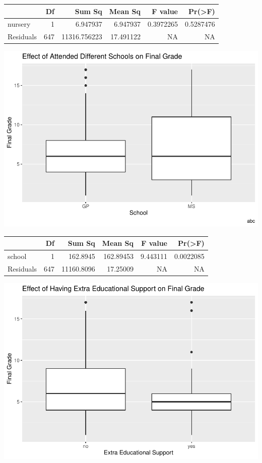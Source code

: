 \documentclass[
]{article}
\begin{document}
\begin{tabular}{l|r|r|r|r|r}
\hline
  & Df & Sum Sq & Mean Sq & F value & Pr(>F)\\
\hline
nursery & 1 & 6.947937 & 6.947937 & 0.3972265 & 0.5287476\\
\hline
Residuals & 647 & 11316.756223 & 17.491122 & NA & NA\\
\hline
\end{tabular}
\newpage

\includegraphics{proj.-1write-up_files/figure-latex/por-school-1.pdf}

\begin{tabular}{l|r|r|r|r|r}
\hline
  & Df & Sum Sq & Mean Sq & F value & Pr(>F)\\
\hline
school & 1 & 162.8945 & 162.89453 & 9.443111 & 0.0022085\\
\hline
Residuals & 647 & 11160.8096 & 17.25009 & NA & NA\\
\hline
\end{tabular}
\newpage

\includegraphics{proj.-1write-up_files/figure-latex/por-schoolsup-1.pdf}
\end{document}
